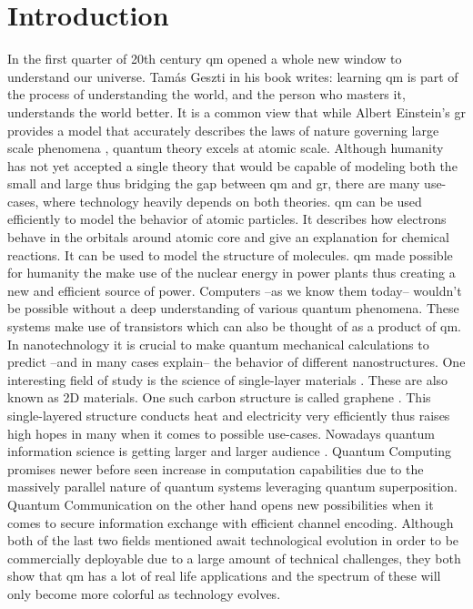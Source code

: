 \section{Introduction}

In the first quarter of 20th century \acrfull{qm} opened a whole new window to understand our universe. Tamás Geszti in his book \cite{geszti2007} writes: learning \acrshort{qm} is part of the process of understanding the world, and the person who masters it, understands the world better.
It is a common view that while Albert Einstein's \acrfull{gr} provides a model that accurately describes the laws of nature governing large scale phenomena \cite{wald2010general}, quantum theory excels at atomic scale.
Although humanity has not yet accepted a single theory that would be capable of modeling both the small and large thus bridging the gap between \acrshort{qm} and \acrshort{gr}, there are many use-cases, where technology heavily depends on both theories.
\acrshort{qm} can be used efficiently to model the behavior of atomic particles.
It describes how electrons behave in the orbitals around atomic core and give an explanation for chemical reactions.
It can be used to model the structure of molecules.
\acrshort{qm} made possible for humanity the make use of the nuclear energy in power plants thus creating a new and efficient source of power.
Computers --as we know them today-- wouldn't be possible without a deep understanding of various quantum phenomena.
These systems make use of transistors \cite{Ross1998} which can also be thought of as a product of \acrshort{qm}.
In nanotechnology it is crucial to make quantum mechanical calculations to predict --and in many cases explain-- the behavior of different nanostructures.
One interesting field of study is the science of single-layer materials \cite{Zhuang2014}. These are also known as 2D materials.
One such carbon structure is called graphene \cite{VANCSO2013101, Márk2016}.
This single-layered structure conducts heat and electricity very efficiently thus raises high hopes in many when it comes to possible use-cases.
Nowadays quantum information science is getting larger and larger audience \cite{imresandor2004}.
Quantum Computing promises newer before seen increase in computation capabilities due to the massively parallel nature of quantum systems leveraging quantum superposition. Quantum Communication on the other hand opens new possibilities when it comes to secure information exchange with efficient channel encoding.
Although both of the last two fields mentioned await technological evolution in order to be commercially deployable due to a large amount of technical challenges, they both show that \acrshort{qm} has a lot of real life applications and the spectrum of these will only become more colorful as technology evolves.

